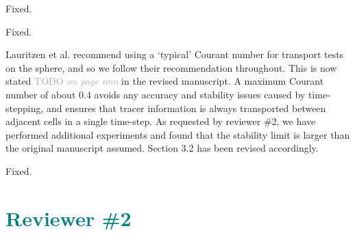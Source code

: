 \documentclass[times]{elsarticle}
\newcommand{\TODO}[1]{\textcolor{darkgray}{TODO \textit{#1}}}
\newcommand{\revtwo}[1]{\textcolor{teal}{\textbf{#1}}}
\begin{document}
\begin{quotation}
\begin{comment}
\item p.9, caption of Fig. 4, first sentence: "A one-dimensional
    least squares fits" should probably read "One-dimensional
    least squares fits".
\end{comment}
\end{quotation}
Fixed.

\begin{quotation}
\begin{comment}
\item p.12, caption of Fig. 6, last but one sentence: "domain is
    shown" instead of "domain in shown".
\end{comment}
\end{quotation}
Fixed.

\begin{quotation}
\begin{comment}
\item Section 3: Why are most of the experiments run with maximum CFL
    numbers < 0.5 or even < 0.4, although the cubic-fit scheme
    permits a maximum CFL < 1 (Fig. 10)? Is this because the upwind
    scheme, to which cubic-fit is compared to, is more limited with
    respect to the time step for the considered test cases?
\end{comment}
\end{quotation}
Lauritzen et al. \citep{lauritzen2012} recommend using a `typical' Courant number for transport tests on the sphere, and so we follow their recommendation throughout.  This is now stated \TODO{on page nnn} in the revised manuscript.
A maximum Courant number of about 0.4 avoids any accuracy and stability issues caused by time-stepping, and ensures that tracer information is always transported between adjacent cells in a single time-step.
As requested by reviewer \#2, we have performed additional experiments and found that the stability limit is larger than the original manuscript assumed.  Section 3.2 has been revised accordingly.

\begin{quotation}
\begin{comment}
\item p. 18, last but one paragraph, last sentence: correct "imprintingin".
\end{comment}
\end{quotation}
Fixed.


\section*{\revtwo{Reviewer \#2}}
\end{document}
